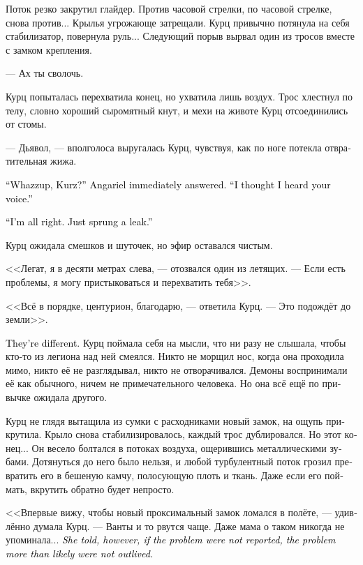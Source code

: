 \documentclass[a4paper,12pt,fleqn]{book}\usepackage{cooltooltips}\usepackage{polyglossia}\setdefaultlanguage[babelshorthands=true]{russian}\setotherlanguage{english}\defaultfontfeatures{Ligatures=TeX,Mapping=tex-text} \usepackage{xcolor}\definecolor{lightgray}{HTML}{bbbbbb}\color{lightgray}\newcommand{\ml}[3]{\textenglish{\textcolor{black}{#3}}}
\begin{document}
Поток резко закрутил глайдер.
Против часовой стрелки, по часовой стрелке, снова против...
Крылья угрожающе затрещали.
Курц привычно потянула на себя стабилизатор, повернула руль...
Следующий порыв вырвал один из тросов вместе с замком крепления.

--- Ах ты сволочь.

Курц попыталась перехватила конец, но ухватила лишь воздух.
Трос хлестнул по телу, словно хороший сыромятный кнут, и мехи на животе Курц отсоединились от стомы.

--- Дьявол, --- вполголоса выругалась Курц, чувствуя, как по ноге потекла отвратительная жижа.

\ml{$0$}
{<<Что такое, Курц? --- тут же отозвалась Ангарьель.}
{``Whazzup, Kurz?'' Angariel immediately answered.}
\ml{$0$}
{--- Мне послышался твой голос>>.}
{``I thought I heard your voice.''}

\ml{$0$}
{<<Всё нормально.}
{``I'm all right.}
\ml{$0$}
{Я просто немного дала течь>>.}
{Just sprung a leak.''}

Курц ожидала смешков и шуточек, но эфир оставался чистым.

<<Легат, я в десяти метрах слева, --- отозвался один из летящих.
--- Если есть проблемы, я могу пристыковаться и перехватить тебя>>.

<<Всё в порядке, центурион, благодарю, --- ответила Курц.
--- Это подождёт до земли>>.

\ml{$0$}
{<<Они другие>>.}
{They're different.}
Курц поймала себя на мысли, что ни разу не слышала, чтобы кто-то из легиона над ней смеялся.
Никто не морщил нос, когда она проходила мимо, никто её не разглядывал, никто не отворачивался.
Демоны воспринимали её как обычного, ничем не примечательного человека.
Но она всё ещё по привычке ожидала другого.

Курц не глядя вытащила из сумки с расходниками новый замок, на ощупь прикрутила.
Крыло снова стабилизировалось, каждый трос дублировался.
Но этот конец...
Он весело болтался в потоках воздуха, ощерившись металлическими зубами.
Дотянуться до него было нельзя, и любой турбулентный поток грозил превратить его в бешеную камчу, полосующую плоть и ткань.
Даже если его поймать, вкрутить обратно будет непросто.

<<Впервые вижу, чтобы новый проксимальный замок ломался в полёте, --- удивлённо думала Курц.
--- Ванты и то рвутся чаще.
Даже мама о таком никогда не упоминала...
\ml{$0$}
{Впрочем, она говорила, что если о проблеме никто не сообщал --- вполне вероятно, что проблему никто не пережил>>.}
{\textit{She told, however, if the problem were not reported, the problem more than likely were not outlived.}}
\end{document}
